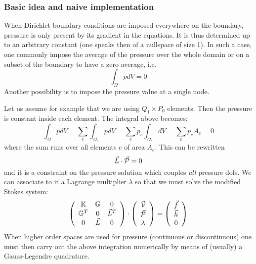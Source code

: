
\subsubsection{Basic idea and naive implementation}

When Dirichlet boundary conditions are imposed everywhere on the boundary, 
pressure is only present by its gradient in 
the equations. It is thus determined up to an arbitrary constant (one speaks then 
of a nullspace of size 1).  
In such a case, one commonly impose the average of the pressure over the whole domain or on 
a subset of the boundary 
to have a zero average, i.e.
\begin{equation}
\int_\Omega p dV = 0
\end{equation}
Another possibility is to impose the pressure value at a single node. 

Let us assume for example that we are using $Q_1 \times P_0$ elements. Then the pressure is constant 
inside each element. 
The integral above becomes:
\begin{equation}
\int_\Omega p dV = 
\sum_e  \int_{\Omega_e} p dV = 
\sum_e  p_e \int_{\Omega_e} dV = 
\sum_e  p_e A_e = 0
\end{equation}
where the sum runs over all elements $e$ of area $A_e$.
This can be rewritten 
\[
\vec{L} \cdot \vec{\cal P}=0
\] 
and it is a constraint on the pressure solution which couples {\it all} pressure dofs. 
We can associate to it a Lagrange multiplier $\lambda$ so that we must solve the modified Stokes system:
\[
\left(
\begin{array}{ccc}
{\mathbb{K}} & {\mathbb{G}} & 0\\ 
{\mathbb{G}}^T & 0 & \vec{L}^T \\
0 & \vec{L} & 0
\end{array}
\right)
\cdot
\left(
\begin{array}{c}
\vec{\cal V} \\ \vec{\cal P} \\ \lambda
\end{array}
\right)
=
\left(
\begin{array}{c}
\vec{f} \\ \vec{h} \\ 0
\end{array}
\right)
\]
When higher order spaces are used for pressure (continuous or discontinuous)
one must then carry out the above integration numerically by means of (usually)
a Gauss-Legendre quadrature.

